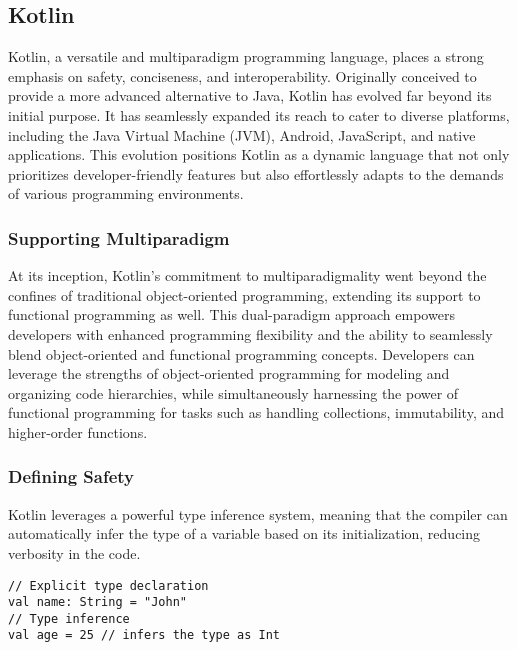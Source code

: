 
\subsection{Kotlin}

Kotlin, a versatile and multiparadigm programming language, places a strong emphasis on safety, conciseness, and 
interoperability. Originally conceived to provide a more advanced alternative to Java, Kotlin has evolved far beyond 
its initial purpose. It has seamlessly expanded its reach to cater to diverse platforms, including the Java Virtual 
Machine (JVM), Android, JavaScript, and native applications. This evolution positions Kotlin as a dynamic language that 
not only prioritizes developer-friendly features but also effortlessly adapts to the demands of various programming 
environments.


\subsubsection{Supporting Multiparadigm}

At its inception, Kotlin's commitment to multiparadigmality went beyond the confines of traditional object-oriented 
programming, extending its support to functional programming as well. This dual-paradigm approach empowers developers 
with enhanced programming flexibility and the ability to seamlessly blend object-oriented and functional programming 
concepts. Developers can leverage the strengths of object-oriented programming for modeling and organizing code 
hierarchies, while simultaneously harnessing the power of functional programming for tasks such as handling collections, 
immutability, and higher-order functions.

\subsubsection{Defining Safety}

Kotlin leverages a powerful type inference system, meaning that the compiler can automatically infer the type of a 
variable based on its initialization, reducing verbosity in the code.

\begin{lstlisting}
// Explicit type declaration
val name: String = "John"
// Type inference
val age = 25 // infers the type as Int
\end{lstlisting}

